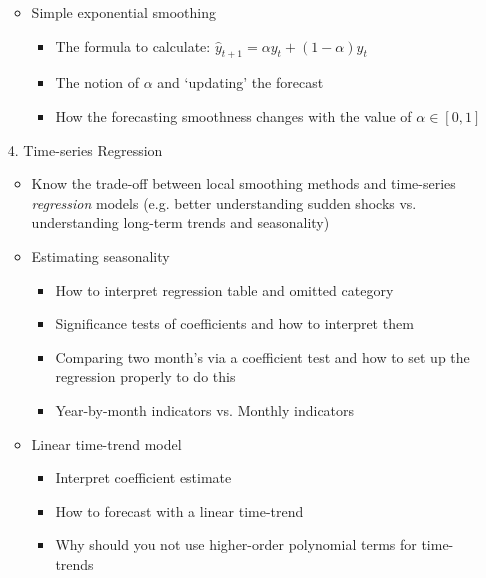 \documentclass[12pt]{article}
\begin{document}
\begin{enumerate}
\begin{itemize}
    \item Simple exponential smoothing
    \begin{itemize}
      \item The formula to calculate: $\hat{y}_{t+1} = \alpha y_t + (1 - \alpha)\hat{y}_t$
      
      \item The notion of $\alpha$ and `updating' the forecast
      
      \item How the forecasting smoothness changes with the value of $\alpha \in [0, 1]$
    \end{itemize}
  \end{itemize}
  

  \item[4.] Time-series Regression
  \begin{itemize}
    \item Know the trade-off between local smoothing methods and time-series \emph{regression} models (e.g. better understanding sudden shocks vs. understanding long-term trends and seasonality)
    
    \item Estimating seasonality
    \begin{itemize}
      \item How to interpret regression table and omitted category
      
      \item Significance tests of coefficients and how to interpret them
      
      \item Comparing two month's via a coefficient test and how to set up the regression properly to do this
      
      \item Year-by-month indicators vs. Monthly indicators
    \end{itemize}

    \item Linear time-trend model
    \begin{itemize}
      \item Interpret coefficient estimate
      
      \item How to forecast with a linear time-trend
      
      \item Why should you not use higher-order polynomial terms for time-trends
    \end{itemize}


\end{itemize}
\end{enumerate}
\end{document}
